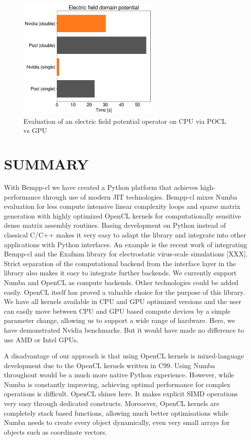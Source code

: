 \begin{figure}
	\center
	\includegraphics[width=7cm]{img/efield_domain_potential}
	\caption{Evaluation of an electric field potential operator on CPU via POCL vs GPU}
	\label{fig:efield_domain_potential}
\end{figure}

\section{SUMMARY}

With Bempp-cl we have created a Python platform that achieves high-performance through use of modern JIT technologies. Bempp-cl mixes Numba evaluation for less compute intensive linear complexity loops and sparse matrix generation with highly optimized OpenCL kernels for computationally sensitive dense matrix assembly routines. Basing development on Python instead of classical C/C++ makes it very easy to adapt the library and integrate into other applications with Python interfaces. An example is the recent work of integrating Bempp-cl and the Exafmm library for electrostatic virus-scale simulations [XXX]. Strict separation of the computational backend from the interface layer in the library also makes it easy to integrate further backends. We currently support Numba and OpenCL as compute backends. Other technologies could be added easily. OpenCL itself has proved a valuable choice for the purpose of this library. We have all kernels available in CPU and GPU optimized versions and the user can easily move between CPU and GPU based compute devices by a simple parameter change, allowing us to support a wide range of hardware. Here, we have demonstrated Nvidia benchmarks. But it would have made no difference to use AMD or Intel GPUs.

A disadvantage of our approach is that using OpenCL kernels is mixed-language development due to the OpenCL kernels written in C99. Using Numba throughout would be a much more native Python experience. However, while Numba is constantly improving, achieving optimal performance for complex operations is difficult. OpenCL shines here. It makes explicit SIMD operations very easy through dedicated constructs. Moreoever, OpenCL kernels are completely stack based functions, allowing much better optimisations while Numba needs to create every object dynamically, even very small arrays for objects such as coordinate vectors.

